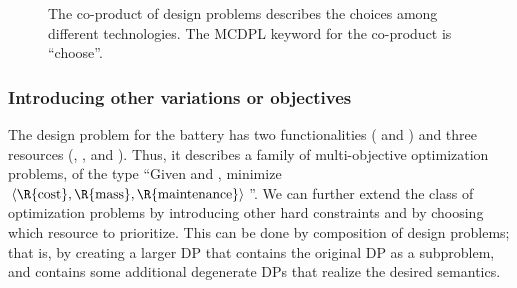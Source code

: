 \begin{figure}[H]

\smallskip{}

\caption{\label{fig:batteriesbig}The co-product of design problems describes
the choices among different technologies. The MCDPL keyword for the
co-product is ``choose''.}
\end{figure}


\subsubsection*{Introducing other variations or objectives}

The design problem for the battery has two functionalities (
and ) and three resources (, ,
and ). Thus, it describes a family of multi-objective
optimization problems, of the type ``Given  and ,
minimize $\left\langle \R{\text{cost}},\R{\text{mass}},\R{\text{maintenance}}\right\rangle $''.
We can further extend the class of optimization problems by introducing
other hard constraints and by choosing which resource to prioritize.
This can be done by composition of design problems; that is, by creating
a larger DP that contains the original DP as a subproblem, and contains
some additional degenerate DPs that realize the desired semantics.

